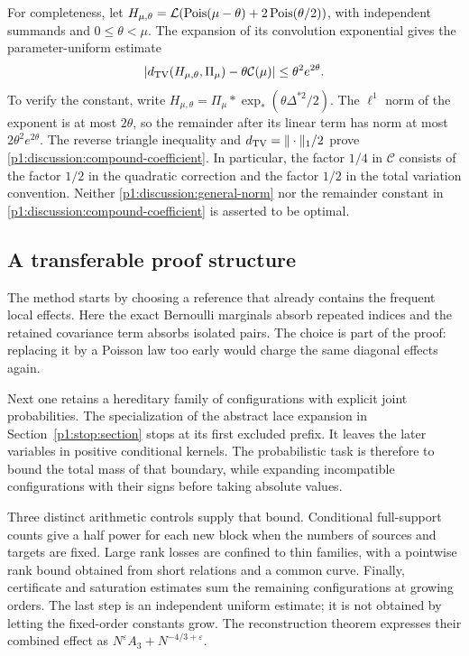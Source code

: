 For completeness, let
$H_{\mu,\theta}=\mathcal L(\operatorname{Pois}(\mu-\theta)+2\operatorname{Pois}(\theta/2))$,
with independent summands and $0\le\theta<\mu$.
The expansion of its convolution exponential gives the
parameter-uniform estimate
\begin{equation}
 \left|d_{\mathrm{TV}}(H_{\mu,\theta},\Pi_\mu)
                     -\theta\mathcal C(\mu)\right|
       \le\theta^2e^{2\theta}.
 \label{p1:discussion:compound-coefficient}
\end{equation}
To verify the constant, write
$H_{\mu,\theta}
 =\Pi_\mu*\exp_*(\theta\Delta^{*2}/2)$.
The $\ell^1$ norm of the exponent is at most $2\theta$,
so the remainder after its linear term has norm at most
$2\theta^2e^{2\theta}$.
The reverse triangle inequality and
$d_{\mathrm{TV}}=\|\cdot\|_1/2$ prove
\eqref{p1:discussion:compound-coefficient}.
In particular, the factor $1/4$ in $\mathcal C$ consists
of the factor $1/2$ in the quadratic correction and the
factor $1/2$ in the total variation convention.
Neither \eqref{p1:discussion:general-norm} nor the remainder
constant in \eqref{p1:discussion:compound-coefficient} is
asserted to be optimal.

\subsection{A transferable proof structure}

The method starts by choosing a reference that already contains the
frequent local effects. Here the exact Bernoulli marginals absorb repeated
indices and the retained covariance term absorbs isolated pairs. The
choice is part of the proof: replacing it by a Poisson law too early would
charge the same diagonal effects again.

Next one retains a hereditary family of configurations with explicit joint
probabilities. The specialization of the abstract lace expansion
\cite{zeilberger1997} in Section~\ref{p1:stop:section}
stops at its first excluded prefix.
It leaves the later variables in positive conditional kernels. The
probabilistic task is therefore to bound the total mass of that boundary,
while expanding incompatible configurations with their signs before taking
absolute values.

Three distinct arithmetic controls supply that bound. Conditional
full-support counts give a half power for each new block when the numbers
of sources and targets are fixed. Large rank losses are confined to thin
families, with a pointwise rank bound obtained from short relations and a
common curve. Finally, certificate and saturation estimates sum the
remaining configurations at growing orders. The last step is an independent
uniform estimate; it is not obtained by letting the fixed-order constants
grow. The reconstruction theorem expresses their combined effect as
$N^\varepsilon A_3+N^{-4/3+\varepsilon}$.

